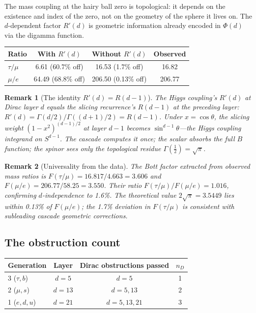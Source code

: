 \documentclass[12pt,a4paper]{article}
\newtheorem*{remark}{Remark}
\begin{document}
The mass coupling at the hairy ball zero is topological: it depends on the existence and index of the zero, not on the geometry of the sphere it lives on. The $d$-dependent factor $R'(d)$ is geometric information already encoded in $\Phi(d)$ via the digamma function.

\begin{center}
\begin{tabular}{lccc}
\hline
Ratio & With $R'(d)$ & Without $R'(d)$ & Observed \\
\hline
$\tau/\mu$ & 6.61 (60.7\% off) & 16.53 (1.7\% off) & 16.82 \\
$\mu/e$ & 64.49 (68.8\% off) & 206.50 (0.13\% off) & 206.77 \\
\hline
\end{tabular}
\end{center}

\begin{remark}[The identity $R'(d) = R(d-1)$]
The Higgs coupling's $R'(d)$ at Dirac layer $d$ equals the slicing recurrence's $R(d-1)$ at the preceding layer: $R'(d) = \Gamma(d/2)/\Gamma((d+1)/2) = R(d-1)$. Under $x = \cos\theta$, the slicing weight $(1 - x^2)^{(d-1)/2}$ at layer $d - 1$ becomes $\sin^{d-1}\theta$---the Higgs coupling integrand on $S^{d-1}$. The cascade computes it once; the scalar absorbs the full $B$ function; the spinor sees only the topological residue $\Gamma(\tfrac{1}{2}) = \sqrt{\pi}$.
\end{remark}

\begin{remark}[Universality from the data]
The Bott factor extracted from observed mass ratios is $F(\tau/\mu) = 16.817/4.663 = 3.606$ and $F(\mu/e) = 206.77/58.25 = 3.550$. Their ratio $F(\tau/\mu)/F(\mu/e) = 1.016$, confirming $d$-independence to 1.6\%. The theoretical value $2\sqrt{\pi} = 3.5449$ lies within 0.13\% of $F(\mu/e)$; the 1.7\% deviation in $F(\tau/\mu)$ is consistent with subleading cascade geometric corrections.
\end{remark}

\subsection{The obstruction count}

\begin{center}
\begin{tabular}{lccc}
\hline
Generation & Layer & Dirac obstructions passed & $n_D$ \\
\hline
3 ($\tau, b$) & $d = 5$ & $d = 5$ & 1 \\
2 ($\mu, s$) & $d = 13$ & $d = 5, 13$ & 2 \\
1 ($e, d, u$) & $d = 21$ & $d = 5, 13, 21$ & 3 \\
\hline
\end{tabular}
\end{center}
\end{document}
